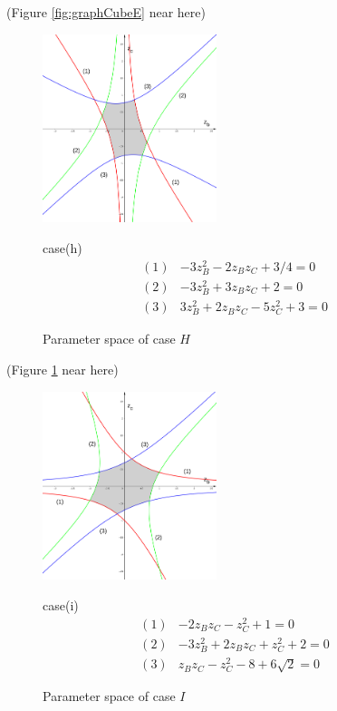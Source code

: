 \documentclass[suppldata, dvipdfmx]{interact}
\theoremstyle{plain}%
\theoremstyle{definition}
\theoremstyle{remark}
\theoremstyle{problemstyle}
\begin{document}
\noindent(Figure \ref{fig:graphCubeE} near here)

\begin{figure}[h!tbp]
 \begin{minipage}[]{0.5\textwidth}
 \centering
 \includegraphics[width=2in,
 keepaspectratio]{./img/graph/cubeH.jpg}
 \caption{Parameter space of case $H$}
 \label{fig:graphCubeH}
 \end{minipage}
 \hspace*{\fill}
 \begin{minipage}[]{0.5\textwidth}
  \centering
  case(h)
  \begin{align*}
   (1)& -3z_B^2 - 2z_Bz_C + 3/4 = 0\\
   (2)& -3z_B^2 + 3 z_Bz_C + 2 = 0\\
   (3)&  3z_B^2 + 2z_Bz_C -5z_C^2 + 3 = 0
  \end{align*}
 \end{minipage}
 \hspace*{\fill}
\end{figure}

\noindent(Figure \ref{fig:graphCubeH} near here)

\begin{figure}[h!tbp]
 \begin{minipage}[]{0.5\textwidth}
 \centering
 \includegraphics[width=2in,
 keepaspectratio]{./img/graph/cubeI.jpg}
 \caption{Parameter space of case $I$}
 \label{fig:graphCubeI}
 \end{minipage}
 \hspace*{\fill}
 \begin{minipage}[]{0.5\textwidth}
  \centering
  case(i)
  \begin{align*}
   (1)& -2z_Bz_C - z_C^2 + 1 = 0\\
   (2)& -3z_B^2 + 2 z_B z_C + z_C^2 + 2 = 0\\
   (3)& z_Bz_C - z_C^2 - 8 + 6\sqrt{2} = 0
  \end{align*}
 \end{minipage}
 \hspace*{\fill}
\end{figure}
\end{document}
